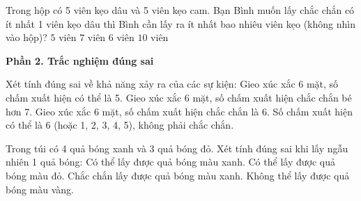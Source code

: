 \begin{ex} %
Trong hộp có 5 viên kẹo dâu và 5 viên kẹo cam. Bạn Bình muốn lấy chắc chắn có ít nhất 1 viên kẹo dâu thì Bình cần lấy ra ít nhất bao nhiêu viên kẹo (không nhìn vào hộp)?
\choice
{$5$ viên}
{$7$ viên}
{\True $6$ viên}
{$10$ viên}
\end{ex}

\textbf{Phần 2. Trắc nghiệm đúng sai}

\begin{ex} %
Xét tính đúng sai về khả năng xảy ra của các sự kiện:
\choiceTF
{\True Gieo xúc xắc 6 mặt, số chấm xuất hiện có thể là 5.}
{\True Gieo xúc xắc 6 mặt, số chấm xuất hiện chắc chắn bé hơn 7.}
{Gieo xúc xắc 6 mặt, số chấm xuất hiện chắc chắn là 6.}
{\True Số chấm xuất hiện có thể là 6 (hoặc 1, 2, 3, 4, 5), không phải chắc chắn.}
\end{ex}

\begin{ex} %
Trong túi có 4 quả bóng xanh và 3 quả bóng đỏ. Xét tính đúng sai khi lấy ngẫu nhiên 1 quả bóng:
\choiceTF
{\True Có thể lấy được quả bóng màu xanh.}
{\True Có thể lấy được quả bóng màu đỏ.}
{Chắc chắn lấy được quả bóng màu xanh.}
{\True Không thể lấy được quả bóng màu vàng.}
\end{ex}

